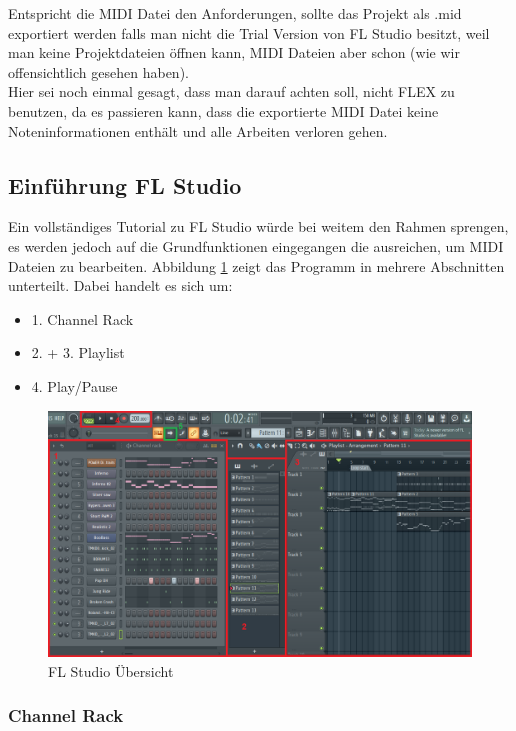 \bigskip

Entspricht die MIDI Datei den Anforderungen, sollte das Projekt als .mid exportiert werden falls man nicht die Trial Version von FL Studio besitzt, weil man keine Projektdateien öffnen kann, MIDI Dateien aber schon (wie wir offensichtlich gesehen haben). \\
Hier sei noch einmal gesagt, dass man darauf achten soll, nicht FLEX zu benutzen, da es passieren kann, dass die exportierte MIDI Datei keine Noteninformationen enthält und alle Arbeiten verloren gehen.

\subsection{Einführung FL Studio}

Ein vollständiges Tutorial zu FL Studio würde bei weitem den Rahmen sprengen, es werden jedoch auf die Grundfunktionen eingegangen die ausreichen, um MIDI Dateien zu bearbeiten. Abbildung \ref{FLStudio} zeigt das Programm in mehrere Abschnitten unterteilt. Dabei  handelt es sich um:


\begin{itemize}
	\item 1. Channel Rack
	\item 2. + 3. Playlist
	\item 4. Play/Pause
\end{itemize}


\begin{figure}[htbp] \centering
	\includegraphics[width=.95\linewidth]{images/FLStudio.png}
	\caption{FL Studio Übersicht}
	\label{FLStudio}
\end{figure}

\subsubsection*{Channel Rack}

